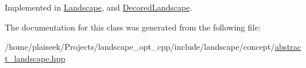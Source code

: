 Implemented in \hyperlink{class_landscape_a77f947fdc6a8c8875d7d383eb5ce7817}{Landscape}, and \hyperlink{class_decored_landscape_a0493646916af886d3d0404760c3d5e4e}{Decored\+Landscape}.



The documentation for this class was generated from the following file\+:\begin{DoxyCompactItemize}
\item 
/home/plaiseek/\+Projects/landscape\+\_\+opt\+\_\+cpp/include/landscape/concept/\hyperlink{abstract__landscape_8hpp}{abstract\+\_\+landscape.\+hpp}\end{DoxyCompactItemize}
